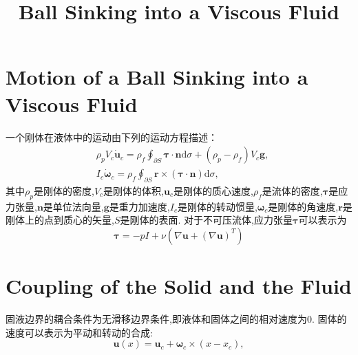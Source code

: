 \documentclass[12pt,halfline,a4paper]{ouparticle}
\begin{document}
\title{Ball Sinking into a Viscous Fluid} 

\author{%
}
\date{}

\maketitle

\section{Motion of a Ball Sinking into a Viscous Fluid}
一个刚体在液体中的运动由下列的运动方程描述：
\begin{equation}\begin{aligned}
    & \rho_{p}V_{c}\dot{\mathbf{u}}_{c}=\rho_{f}\oint_{\partial S}\boldsymbol{\tau}\cdot\mathbf{n}\mathrm{d}\sigma+(\rho_{p}-\rho_{f})V_{c}\mathbf{g}, \\
    & I_{c}\dot{\boldsymbol{\omega}}_{c}=\rho_{f}\oint_{\partial S}\mathbf{r}\times(\boldsymbol{\tau}\cdot\mathbf{n})\mathrm{d}\sigma,
   \end{aligned}\end{equation}
其中$\rho_{p}$是刚体的密度,$V_{c}$是刚体的体积,$\mathbf{u}_{c}$是刚体的质心速度,$\rho_{f}$是流体的密度,$\boldsymbol{\tau}$是应力张量,$\mathbf{n}$是单位法向量,$\mathbf{g}$是重力加速度,$I_{c}$是刚体的转动惯量,$\boldsymbol{\omega}_{c}$是刚体的角速度,$\mathbf{r}$是刚体上的点到质心的矢量,$S$是刚体的表面.
对于不可压流体,应力张量$\boldsymbol{\tau}$可以表示为
$$\boldsymbol \tau = -pI + \nu (\nabla \boldsymbol{u} + (\nabla \boldsymbol{u})^T)$$

\section{Coupling of the Solid and the Fluid}
固液边界的耦合条件为无滑移边界条件,即液体和固体之间的相对速度为0.
固体的速度可以表示为平动和转动的合成:
\begin{equation}\mathbf u(x)=\mathbf{u}_c+\boldsymbol{\omega}_c\times(x-x_c),\end{equation}
\end{document}
